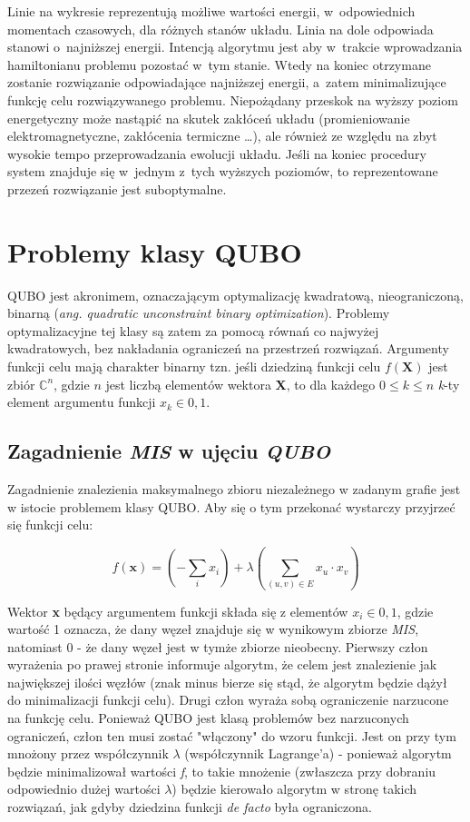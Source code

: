 \documentclass[12pt,a4paper,twoside,openany]{book}
\begin{document}
Linie na wykresie reprezentują możliwe wartości energii, w~odpowiednich momentach czasowych, dla różnych stanów układu.
Linia na dole odpowiada stanowi o~najniższej energii. 
Intencją algorytmu jest aby w~trakcie wprowadzania hamiltonianu problemu pozostać w~tym stanie. 
Wtedy na koniec otrzymane zostanie rozwiązanie odpowiadające najniższej energii, a~zatem minimalizujące funkcję celu rozwiązywanego problemu. 
Niepożądany przeskok na wyższy poziom energetyczny może nastąpić na skutek zakłóceń układu (promieniowanie elektromagnetyczne, zakłócenia termiczne \dots), ale również ze względu na zbyt wysokie tempo przeprowadzania ewolucji układu. 
Jeśli na koniec procedury system znajduje się w~jednym z~tych wyższych poziomów, to reprezentowane przezeń rozwiązanie jest suboptymalne.


\section{Problemy klasy QUBO}

QUBO jest akronimem, oznaczającym optymalizację kwadratową, nieograniczoną, binarną (\textit{ang. quadratic unconstraint binary optimization}).
Problemy optymalizacyjne tej klasy są zatem za pomocą równań co najwyżej kwadratowych, bez nakładania ograniczeń na przestrzeń rozwiązań.
Argumenty funkcji celu mają charakter binarny tzn. jeśli dziedziną funkcji celu $f(\textbf{X})$ jest zbiór $\mathbb{C}^n$, gdzie $n$ jest liczbą elementów wektora \textbf{X}, to dla każdego $0 \leq k \leq n$ \textit{k}-ty element argumentu funkcji $x_k \in {0, 1}$.

\subsection{Zagadnienie \textit{MIS} w ujęciu \textit{QUBO}}

Zagadnienie znalezienia maksymalnego zbioru niezależnego w zadanym grafie jest w istocie problemem klasy QUBO.
Aby się o tym przekonać wystarczy przyjrzeć się funkcji celu:

\begin{equation} \label{mis-qubo}
    f(\textbf{x}) = (-\sum_ix_i) + \lambda(\sum_{(u,v)\in E}x_u \cdot x_v)
\end{equation}

Wektor \textbf{x} będący argumentem funkcji składa się z elementów $x_i \in {0, 1}$, gdzie wartość 1 oznacza, że dany węzeł znajduje się w wynikowym zbiorze \textit{MIS}, natomiast 0 - że dany węzeł jest w tymże zbiorze nieobecny.
Pierwszy człon wyrażenia po prawej stronie informuje algorytm, że celem jest znalezienie jak największej ilości węzłów (znak minus bierze się stąd, że algorytm będzie dążył do minimalizacji funkcji celu).
Drugi człon wyraża sobą ograniczenie narzucone na funkcję celu.
Ponieważ QUBO jest klasą problemów bez narzuconych ograniczeń, człon ten musi zostać "włączony" do wzoru funkcji.
Jest on przy tym mnożony przez współczynnik $\lambda$ (współczynnik Lagrange'a) - ponieważ algorytm będzie minimalizował wartości \textit{f}, to takie mnożenie (zwłaszcza przy dobraniu odpowiednio dużej wartości $\lambda$) będzie kierowało algorytm w stronę takich rozwiązań, jak gdyby dziedzina funkcji \textit{de facto} była ograniczona. 
\end{document}
